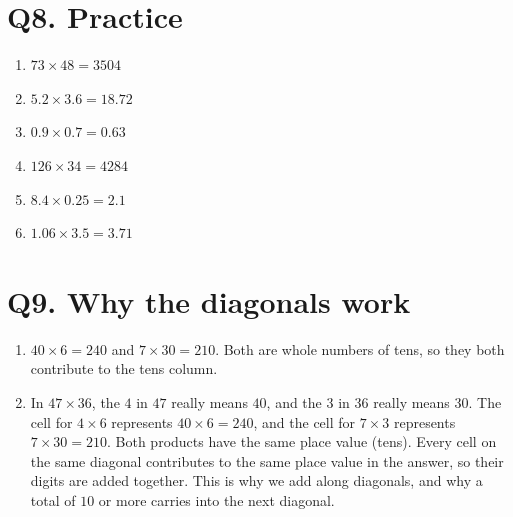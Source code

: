 \documentclass[12pt,a4paper]{article}
\begin{document}
\section*{Q8. Practice}
\begin{enumerate}[label=(\alph*)]
  \item $73\times48 = 3504$
  \item $5.2\times3.6 = 18.72$
  \item $0.9\times0.7 = 0.63$
  \item $126\times34 = 4284$
  \item $8.4\times0.25 = 2.1$
  \item $1.06\times3.5 = 3.71$
\end{enumerate}

\section*{Q9. Why the diagonals work}
\begin{enumerate}[label=(\alph*)]
  \item $40\times6 = 240$ and $7\times30 = 210$. Both are whole numbers of tens, so they both contribute to the tens column.
  \item In $47\times36$, the $4$ in $47$ really means $40$, and the $3$ in $36$ really means $30$. The cell for $4\times6$ represents $40\times6=240$, and the cell for $7\times3$ represents $7\times30=210$. Both products have the same place value (tens). Every cell on the same diagonal contributes to the same place value in the answer, so their digits are added together. This is why we add along diagonals, and why a total of $10$ or more carries into the next diagonal.
\end{enumerate}
\end{document}
